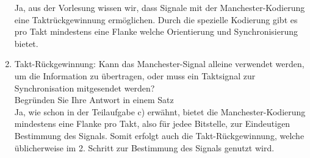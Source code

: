 \documentclass[a4paper]{article}
\begin{document}
\begin{enumerate}[label=\alph*)]
    Ja, aus der Vorlesung wissen wir, dass Signale mit der Manchester-Kodierung eine Taktrückgewinnung ermöglichen. Durch die spezielle Kodierung gibt es pro Takt mindestens eine Flanke welche Orientierung und Synchronisierung bietet.
    \item Takt-Rückgewinnung: Kann das Manchester-Signal alleine verwendet werden, um die Information zu übertragen, oder muss ein Taktsignal zur Synchronisation mitgesendet werden?\\
    Begründen Sie Ihre Antwort in einem Satz\\\bigskip
    Ja, wie schon in der Teilaufgabe c) erwähnt, bietet die Manchester-Kodierung mindestens eine Flanke pro Takt, also für jedee Bitstelle, zur Eindeutigen Bestimmung des Signals. Somit erfolgt auch die Takt-Rückgewinnung, welche üblicherweise im 2. Schritt zur Bestimmung des Signals genutzt wird.
\end{enumerate}
\end{document}
